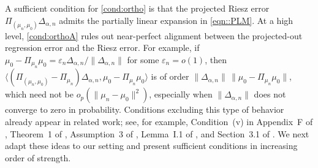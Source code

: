 \documentclass[11pt]{article}
\theoremstyle{plain}
\begin{document}
A sufficient condition for \ref{cond:ortho} is that the projected Riesz error \(\Pi_{(\mu_n,\mu_0)}\Delta_{\alpha,n}\) admits the partially linear expansion in \eqref{eqn::PLM}. At a high level, \ref{cond:orthoA} rules out near-perfect alignment between the projected-out regression error and the Riesz error. For example, if \(\mu_0 - \Pi_{\mu_n}\mu_0 = \varepsilon_n \Delta_{\alpha,n}/\|\Delta_{\alpha,n}\|\) for some \(\varepsilon_n=o(1)\), then \(\langle (\Pi_{(\mu_n,\mu_0)}-\Pi_{\mu_n})\Delta_{\alpha,n}, \mu_0-\Pi_{\mu_n}\mu_0\rangle\) is of order \(\|\Delta_{\alpha,n}\|\,\|\mu_0-\Pi_{\mu_n}\mu_0\|\), which need not be \(o_p(\|\mu_n-\mu_0\|^2)\), especially when \(\|\Delta_{\alpha,n}\|\) does not converge to zero in probability. Conditions excluding this type of behavior already appear in related work; see, for example, Condition~(v) in Appendix~F of \citet{benkeser2020nonparametric}, Theorem~1 of \citet{benkeser2017doubly}, Assumption~3 of \citet{dukes2024doubly}, Lemma~I.1 of \citet{wang2023super}, and Section~3.1 of \citet{bonvini2024doubly}. We next adapt these ideas to our setting and present sufficient conditions in increasing order of strength.

 



 
\end{document}
